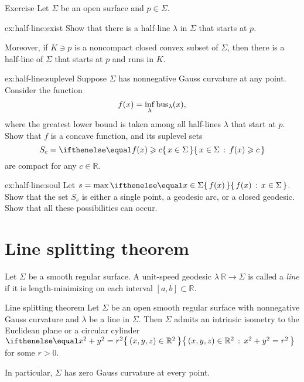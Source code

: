 \begin{thm}{Exercise}\label{ex:half-line}
Let $\Sigma$ be an open surface and $p\in\Sigma$.

\begin{subthm}{ex:half-line:exist}
Show that there is a half-line $\lambda$ in $\Sigma$ that starts at $p$.

Moreover, if $K\ni p$ is a noncompact closed convex subset of $\Sigma$, then there is a half-line of $\Sigma$ that starts at $p$ and runs in $K$.
\end{subthm}

\begin{subthm}{ex:half-line:suplevel}
Suppose $\Sigma$ has nonnegative Gauss curvature at any point.
Consider the function
\[f(x)=\inf_\lambda\mathop{\rm bus}\nolimits_\lambda(x),\]
where the greatest lower bound is taken among all half-lines $\lambda$ that start at $p$.
Show that $f$ is a concave function, and its suplevel sets 
\[S_c=\set{x\in\Sigma}{f(x)\ge c}\] 
are compact for any $c\in\mathbb{R}$.
\end{subthm}

\begin{subthm}{ex:half-line:soul}
Let $s=\max\set{f(x)}{x\in\Sigma}$.
Show that the set $S_s$ is either a single point, a geodesic arc, or a closed geodesic.
Show that all these possibilities can occur.
\end{subthm}

\end{thm}

\section{Line splitting theorem}

Let $\Sigma$ be a smooth regular surface.
A unit-speed geodesic $\lambda\:\mathbb{R}\to\Sigma$ is called a \emph{line} if it is length-minimizing on each interval $[a,b]\subset \mathbb{R}$.

\begin{thm}{Line splitting theorem}\label{thm:splitting}
Let $\Sigma$ be an open smooth regular surface with nonnegative Gauss curvature
and $\lambda$ be a line in $\Sigma$. 
Then $\Sigma$ admits an intrinsic isometry to the Euclidean plane or a circular cylinder $\set{(x,y,z)\in \mathbb{R}^2}{x^2+y^2=r^2}$ for some $r>0$.

In particular, $\Sigma$ has zero Gauss curvature at every point.
\end{thm}

